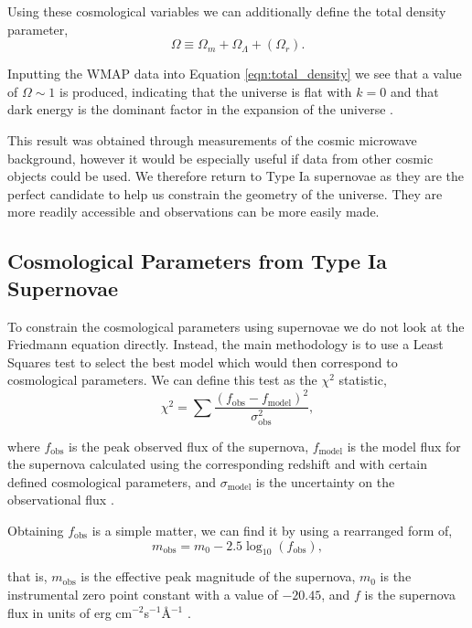 \documentclass[twocolumn]{revtex4}
\begin{document}
Using these cosmological variables we can additionally define the total density parameter,
\begin{equation}
\Omega \equiv \Omega_m + \Omega_{\Lambda} + (\Omega_{r}).
\label{eqn:total_density}
\end{equation}

Inputting the WMAP data into Equation \ref{eqn:total_density} we see that a value of $\Omega \sim 1$ is produced, indicating that the universe is flat with $k=0$ and that dark energy is the dominant factor in the expansion of the universe \cite{mod_ast}.

This result was obtained through measurements of the cosmic microwave background, however it would be especially useful if data from other cosmic objects could be used. We therefore return to Type Ia supernovae as they are the perfect candidate to help us constrain the geometry of the universe. They are more readily accessible and observations can be more easily made. 

\vspace{-3ex}
\subsection{Cosmological Parameters from Type Ia Supernovae}
\vspace{-2ex}
To constrain the cosmological parameters using supernovae we do not look at the Friedmann equation directly. Instead, the main methodology is to use a Least Squares test to select the best model which would then correspond to cosmological parameters. We can define this test as the $\chi^2$ statistic, 
\begin{equation}
\chi^2 = \sum \frac{(f_\text{obs}-f_\text{model})^2}{\sigma_\text{obs}^2},
\label{eqn:chi_eqn}
\end{equation}

where $f_\text{obs}$ is the peak observed flux of the supernova, $f_\text{model}$ is the model flux for the supernova calculated using the corresponding redshift and with certain defined cosmological parameters, and $\sigma_\text{model}$ is the uncertainty on the observational flux \cite{script}.

Obtaining $f_\text{obs}$ is a simple matter, we can find it by using a rearranged form of,
\begin{equation}
m_\text{obs}=m_0 - 2.5\log_{10}(f_\text{obs}),
\label{eqn:mag_flux}
\end{equation}

that is, $m_\text{obs}$ is the effective peak magnitude of the supernova, $m_0$ is the instrumental zero point constant with a value of $-20.45$, and $f$ is the supernova flux in units of erg cm$^{-2}$s$^{-1}$\AA$^{-1}$ \cite{script}.
\end{document}
